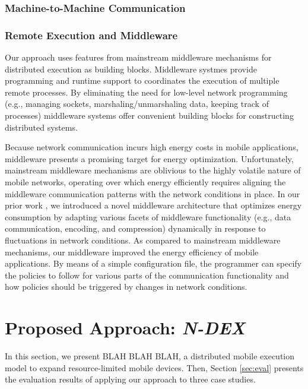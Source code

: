 \documentclass[conference]{IEEEtran}
\begin{document}

\subsubsection{Machine-to-Machine Communication}

\subsubsection{Remote Execution and Middleware}
Our approach uses features from mainstream middleware mechanisms for distributed execution as building blocks. Middleware systmes provide programming and runtime support to coordinates the execution of multiple remote processes. By eliminating the need for low-level network programming (e.g., managing sockets, marshaling/unmarshaling data, keeping track of processes) middleware systems offer convenient building blocks for constructing distributed systems. 

Because network communication incurs high energy costs in mobile applications, middleware presents a promising target for energy optimization. Unfortunately, mainstream middleware mechanisms are oblivious to the highly volatile nature of mobile networks, operating over which energy efficiently requires aligning the middleware communication patterns with the network conditions in place. In our prior work \cite{kwon+:mobicase14-middleware}, we introduced a novel middleware architecture that optimizes energy consumption by adapting various facets of middleware functionality (e.g., data communication, encoding, and compression) dynamically in response to fluctuations in network conditions. As compared to mainstream middleware mechanisms, our middleware improved the energy efficiency of mobile applications. By means of a simple configuration file, the programmer can specify the policies to follow for various parts of the communication functionality and how policies should be triggered by changes in network conditions.


\section{Proposed Approach: \emph{N-DEX}}
\label{sec:approach}
In this section, we present BLAH BLAH BLAH, a distributed mobile execution model to expand resource-limited mobile devices. Then, Section \ref{sec:eval} presents the evaluation results of applying our approach to three case studies.
\end{document}

